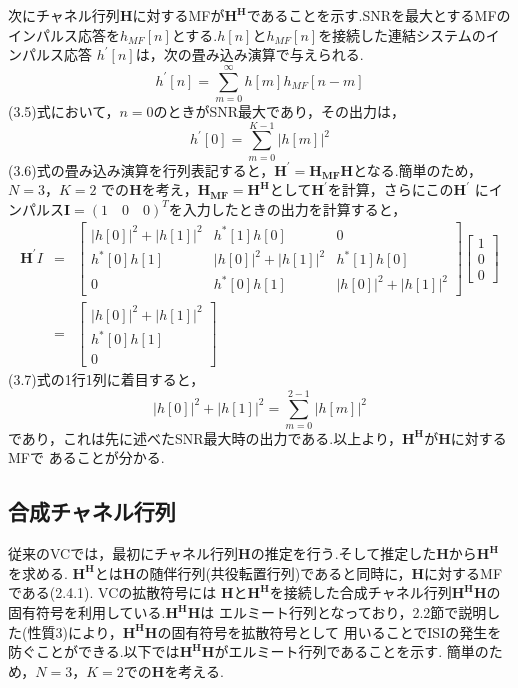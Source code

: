 次にチャネル行列$\bm{H}$に対するMFが$\bm{H^H}$であることを示す.SNRを最大とするMFの
インパルス応答を$h_{MF}[n]$とする.$h[n]$と$h_{MF}[n]$を接続した連結システムのインパルス応答
$h^{\prime}[n]$は，次の畳み込み演算で与えられる.
\begin{equation}
    h^{\prime}[n] = \sum_{m=0}^{\infty} h[m]h_{MF}[n-m]
\end{equation}
(3.5)式において，$n=0$のときがSNR最大であり，その出力は，
\begin{equation}
    h^{\prime}[0] = \sum_{m=0}^{K-1} |h[m]|^2
\end{equation}
(3.6)式の畳み込み演算を行列表記すると，$\bm{H^{\prime}}=\bm{H_{MF}H}$となる.簡単のため，$N=3$，$K=2$
での$\bm{H}$を考え，$\bm{H_{MF}=\bm{H^H}}$として$\bm{H^{\prime}}$を計算，さらにこの$\bm{H^{\prime}}$
にインパルス$\bm{I}=(1 \quad 0 \quad 0)^T$を入力したときの出力を計算すると，
\begin{eqnarray}
    \bm{H^{\prime}}I &=& \left[
        \begin{array}{ccc}
            |h[0]|^2+|h[1]|^2 & h^*[1]h[0] & 0 \\
            h^*[0]h[1] & |h[0]|^2+|h[1]|^2 & h^*[1]h[0] \\
            0 & h^*[0]h[1] & |h[0]|^2+|h[1]|^2
        \end{array}
    \right]
    \left[
        \begin{array}{c}
            1 \\
            0 \\
            0
        \end{array} 
    \right] \nonumber \\
    &=& \left[
        \begin{array}{c}
            |h[0]|^2+|h[1]|^2 \\
            h^*[0]h[1] \\
            0
        \end{array}
    \right]
\end{eqnarray}
(3.7)式の1行1列に着目すると，
\begin{equation}
    |h[0]|^2+|h[1]|^2 = \sum_{m=0}^{2-1} |h[m]|^2 \nonumber
\end{equation}
であり，これは先に述べたSNR最大時の出力である.以上より，$\bm{H^H}$が$\bm{H}$に対するMFで
あることが分かる.

\subsection{合成チャネル行列}
従来のVCでは，最初にチャネル行列$\bm{H}$の推定を行う.そして推定した$\bm{H}$から$\bm{H^H}$を求める.
$\bm{H^H}$とは$\bm{H}$の随伴行列(共役転置行列)であると同時に，$\bm{H}$に対するMFである(2.4.1).
VCの拡散符号には
$\bm{H}$と$\bm{H^H}$を接続した合成チャネル行列$\bm{H^HH}$の固有符号を利用している.$\bm{H^HH}$は
エルミート行列となっており，2.2節で説明した(性質3)により，$\bm{H^HH}$の固有符号を拡散符号として
用いることでISIの発生を防ぐことができる.以下では$\bm{H^HH}$がエルミート行列であることを示す.
簡単のため，$N=3$，$K=2$での$\bm{H}$を考える.

